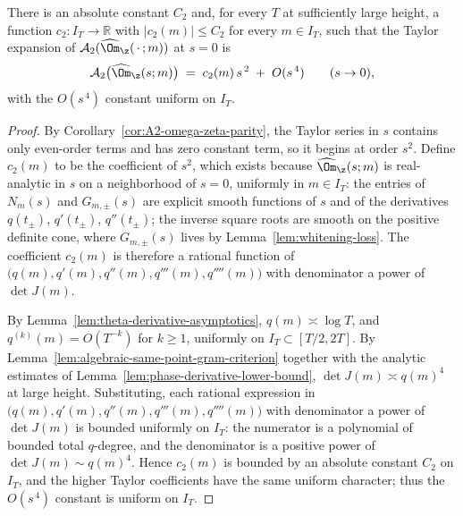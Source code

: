 \begin{lemma}
\label{lem:omega-zeta-c2-bounded}
There is an absolute constant \(C_2\) and, for every \(T\) at
sufficiently large height, a function \(c_2: I_T\to\mathbb R\) with
\(|c_2(m)|\le C_2\) for every \(m\in I_T\), such that the Taylor
expansion of \(\mathcal A_2(\widehat\Om_\z(\,\cdot\,;m))\) at \(s=0\) is
\begin{equation}
\label{eq:omega-zeta-c2-expansion}
        \mathcal A_2\bigl(\widehat\Om_\z(s;m)\bigr)
        \;=\; c_2(m)\,s^{\,2} \;+\; O(s^{\,4})
        \qquad (s\to 0),
\end{equation}
with the \(O(s^{\,4})\) constant uniform on \(I_T\).
\end{lemma}

\begin{proof}
By Corollary~\ref{cor:A2-omega-zeta-parity}, the Taylor series in \(s\)
contains only even-order terms and has zero constant term, so it
begins at order \(s^2\).  Define \(c_2(m)\) to be the coefficient of
\(s^2\), which exists because \(\widehat\Om_\z(s;m)\) is real-analytic
in \(s\) on a neighborhood of \(s=0\), uniformly in \(m\in I_T\): the
entries of \(N_m(s)\) and \(G_{m,\pm}(s)\) are explicit smooth
functions of \(s\) and of the derivatives \(q(t_\pm)\), \(q'(t_\pm)\),
\(q''(t_\pm)\); the inverse square roots are smooth on the positive
definite cone, where \(G_{m,\pm}(s)\) lives by
Lemma~\ref{lem:whitening-loss}.  The coefficient \(c_2(m)\) is
therefore a rational function of \(\bigl(q(m), q'(m), q''(m), q'''(m),
q''''(m)\bigr)\) with denominator a power of \(\det J(m)\).

By Lemma~\ref{lem:theta-derivative-asymptotics},
\(q(m)\asymp\log T\), and \(q^{(k)}(m)=O(T^{-k})\) for \(k\ge 1\),
uniformly on \(I_T\subset[T/2,2T]\).  By
Lemma~\ref{lem:algebraic-same-point-gram-criterion} together with the
analytic estimates of
Lemma~\ref{lem:phase-derivative-lower-bound},
\(\det J(m)\asymp q(m)^4\) at large height.  Substituting,
each rational expression in
\(\bigl(q(m), q'(m), q''(m), q'''(m), q''''(m)\bigr)\) with denominator
a power of \(\det J(m)\) is bounded uniformly on \(I_T\): the numerator
is a polynomial of bounded total \(q\)-degree, and the denominator is
a positive power of \(\det J(m)\sim q(m)^4\).  Hence \(c_2(m)\) is
bounded by an absolute constant \(C_2\) on \(I_T\), and the higher
Taylor coefficients have the same uniform character; thus the
\(O(s^{\,4})\) constant is uniform on \(I_T\).
\end{proof}

